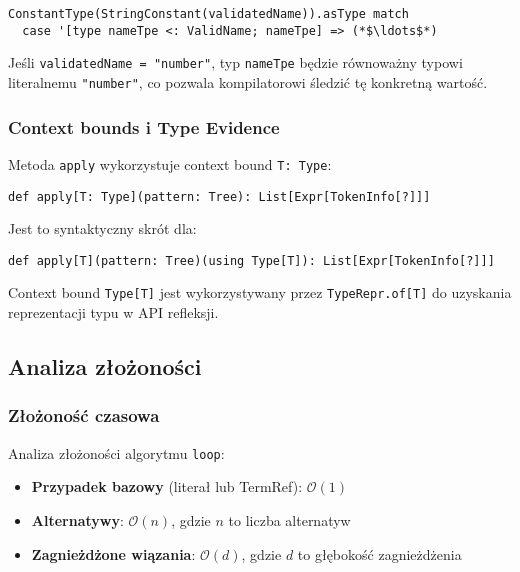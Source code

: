 \begin{lstlisting}
ConstantType(StringConstant(validatedName)).asType match
  case '[type nameTpe <: ValidName; nameTpe] => (*$\ldots$*)
\end{lstlisting}

Jeśli \texttt{validatedName = "number"}, typ \texttt{nameTpe} będzie równoważny typowi literalnemu \texttt{"number"}, co pozwala kompilatorowi śledzić tę konkretną wartość.

\subsubsection{Context bounds i Type Evidence}
\label{subsubsec:cnp-context-bounds}

Metoda \texttt{apply} wykorzystuje context bound \texttt{T: Type}:

\begin{lstlisting}
def apply[T: Type](pattern: Tree): List[Expr[TokenInfo[?]]]
\end{lstlisting}

Jest to syntaktyczny skrót dla:

\begin{lstlisting}
def apply[T](pattern: Tree)(using Type[T]): List[Expr[TokenInfo[?]]]
\end{lstlisting}

Context bound \texttt{Type[T]} jest wykorzystywany przez \texttt{TypeRepr.of[T]} do uzyskania reprezentacji typu w API refleksji.

\subsection{Analiza złożoności}
\label{subsec:cnp-complexity}

\subsubsection{Złożoność czasowa}
\label{subsubsec:cnp-time-complexity}

Analiza złożoności algorytmu \texttt{loop}:

\begin{itemize}
    \item \textbf{Przypadek bazowy} (literał lub TermRef): \(\mathcal{O}(1)\)
    \item \textbf{Alternatywy}: \(\mathcal{O}(n)\), gdzie \(n\) to liczba alternatyw
    \item \textbf{Zagnieżdżone wiązania}: \(\mathcal{O}(d)\), gdzie \(d\) to głębokość zagnieżdżenia
\end{itemize}

